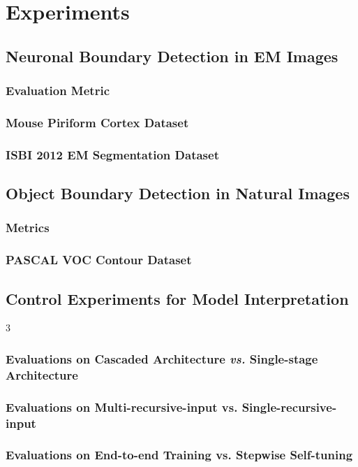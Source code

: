 \documentclass[senior]{IPSstyle}
\begin{document}


\chapter{Experiments} \label{experiments}


\section{Neuronal Boundary Detection in EM Images}



\subsection{Evaluation Metric}

\subsection{Mouse Piriform Cortex Dataset}\label{experiment of piriform}


\subsection{ISBI 2012 EM Segmentation Dataset}


\section{Object Boundary Detection in Natural Images}
\subsection{Metrics}
\subsection{PASCAL VOC Contour Dataset}

\section{Control Experiments for Model Interpretation}3

\subsection{Evaluations on Cascaded Architecture \emph{vs.} Single-stage Architecture}

\subsection{Evaluations on Multi-recursive-input vs. Single-recursive-input}

\subsection{Evaluations on End-to-end Training vs. Stepwise Self-tuning}




\end{document}
